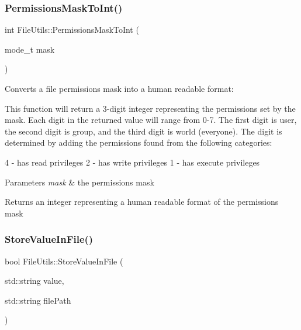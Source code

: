 \subsubsection{\texorpdfstring{Permissions\+Mask\+To\+Int()}{PermissionsMaskToInt()}}
{\footnotesize\ttfamily int File\+Utils\+::\+Permissions\+Mask\+To\+Int (\begin{DoxyParamCaption}\item[{mode\+\_\+t}]{mask }\end{DoxyParamCaption})\hspace{0.3cm}{\ttfamily [static]}}

Converts a file permissions mask into a human readable format\+:

This function will return a 3-\/digit integer representing the permissions set by the mask. Each digit in the returned value will range from 0-\/7. The first digit is user, the second digit is group, and the third digit is world (everyone). The digit is determined by adding the permissions found from the following categories\+:

4 -\/ has read privileges 2 -\/ has write privileges 1 -\/ has execute privileges


\begin{DoxyParams}{Parameters}
{\em mask} & the permissions mask \\
\hline
\end{DoxyParams}
\begin{DoxyReturn}{Returns}
an integer representing a human readable format of the permissions mask 
\end{DoxyReturn}
\mbox{\label{class_aws_1_1_iot_1_1_device_client_1_1_util_1_1_file_utils_a61556e62cd69ac493b7515d454927818}} 
\subsubsection{\texorpdfstring{Store\+Value\+In\+File()}{StoreValueInFile()}}
{\footnotesize\ttfamily bool File\+Utils\+::\+Store\+Value\+In\+File (\begin{DoxyParamCaption}\item[{std\+::string}]{value,  }\item[{std\+::string}]{file\+Path }\end{DoxyParamCaption})\hspace{0.3cm}{\ttfamily [static]}}



